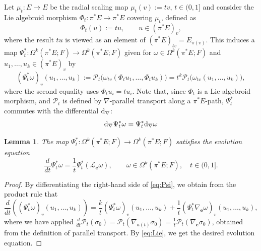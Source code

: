 \documentclass[12pt,letterpaper]{article}
\let\oldd\d
\renewcommand{\d}{%
  \relax\ifmmode\mathrm{d}\else\oldd\fi
}
\newcommand{\e}{\mathbf{e}}
\newcommand{\Lie}{\mathcal{L}}
\newtheorem{lemma}[theorem]{Lemma}
\numberwithin{equation}{section}
\begin{document}
Let $\mu_t: E \to E$ be the radial scaling map $\mu_t(v) := tv$, $t \in (0, 1]$
and consider the Lie algebroid morphism $\Phi_t: \pi^*E \to \pi^*E$ covering $\mu_t$, defined as
\begin{equation*}
    \Phi_t(u) := tu, \qquad u \in (\pi^*E)_v,
\end{equation*}
where the result $tu$ is viewed as an element of $(\pi^*E)_{tv} = E_{\pi(v)}$.
This induces a map $\Psi_t^*: \Omega^k(\pi^*E; F) \to \Omega^k(\pi^*E; F)$
given for $\omega \in \Omega^k(\pi^*E; F)$ and $u_1, \dots, u_k \in (\pi^*E)_v$ by
\begin{equation}\label{eq:Psi}
    (\Psi_t^* \omega)_v(u_1, \dots, u_k) := \mathcal{P}_t\Big(\omega_{tv}(\Phi_t u_1, \dots, \Phi_t u_k)\Big) 
    = t^k \mathcal{P}_t\Big(\omega_{tv}(u_1, \dots, u_k)\Big),
\end{equation}
where the second equality uses $\Phi_t u_i = tu_i$.
Note that, since $\Phi_t$ is a Lie algebroid morphism, 
and $\mathcal{P}_t$ is defined by $\nabla$-parallel transport along a $\pi^*E$-path,
$\Psi_t^*$ commutes with the differential $\d_\nabla$:
\begin{equation}\label{eq:commutation}
    \d_\nabla \Psi_t^* \omega = \Psi_t^* \d_\nabla \omega
\end{equation}

\begin{lemma}\label{lemma:Lie_derivative}
The map $\Psi_t^*: \Omega^k(\pi^*E; F) \to \Omega^k(\pi^*E; F)$ satisfies the evolution equation
\begin{equation}
    \frac{d}{dt} \Psi_t^* \omega = \frac{1}{t} \Psi_t^* (\Lie_\e \omega),
    \qquad
    \omega \in \Omega^k(\pi^*E; F), \quad t \in (0, 1].
\end{equation}
\end{lemma}

\begin{proof}
By differentiating the right-hand side of \eqref{eq:Psi}, we obtain from the product rule that
\begin{equation*}
\frac{d}{dt} \left((\Psi_t^*\omega)_v(u_1, \ldots, u_k)\right) = \frac{k}{t} (\Psi_t^* \omega)_v(u_1, \dots, u_k) + \frac{1}{t} (\Psi_t^* \nabla_\e \omega)_v(u_1, \dots, u_k),
\end{equation*}
where we have applied $\frac{d}{dt}\mathcal{P}_t(\sigma_0) = \mathcal{P}_t\left(\nabla_{a(t)} \sigma_0\right) = \frac{1}{t}\mathcal{P}_t\left(\nabla_\e \sigma_0\right)$, 
obtained from the definition of parallel transport.
By \eqref{eq:Lie}, we get the desired evolution equation.
\end{proof}
\end{document}

